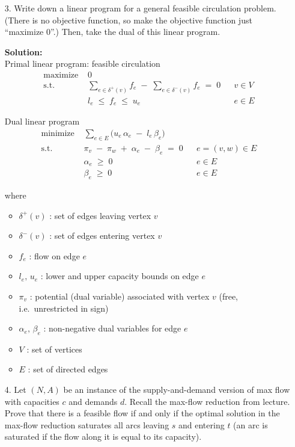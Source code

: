 \documentclass{article}
\begin{document}
\begin{enumerate}
    \newpage

    \item[3.] Write down a linear program for a general feasible circulation problem. (There is no objective function, so make the objective function just ``maximize 0''.)
    Then, take the dual of this linear program.

    \textbf{Solution:} \\

Primal linear program: feasible circulation
\begin{align*}
\text{maximize } & 0 \\[6pt]
\text{s.t. } 
& \sum_{e \in \delta^{+}(v)} f_e \;-\; \sum_{e \in \delta^{-}(v)} f_e \;=\; 0 && v \in V \\[4pt]
& l_e \;\le\; f_e \;\le\; u_e && e \in E
\end{align*}

Dual linear program
\begin{align*}
\text{minimize } & \sum_{e \in E} \bigl(u_e \,\alpha_e \;-\; l_e \,\beta_e\bigr) \\[6pt]
\text{s.t. } 
& \pi_v \;-\; \pi_w \;+\; \alpha_e \;-\; \beta_e \;=\; 0 && e = (v,w) \in E \\[4pt]
& \alpha_e \;\ge\; 0 && e \in E \\[2pt]
& \beta_e \;\ge\; 0 && e \in E
\end{align*}

where
\begin{itemize}
\item $\delta^{+}(v)$ : set of edges leaving vertex $v$
\item $\delta^{-}(v)$ : set of edges entering vertex $v$
\item $f_e$ : flow on edge $e$
\item $l_e,\,u_e$ : lower and upper capacity bounds on edge $e$
\item $\pi_v$ : potential (dual variable) associated with vertex $v$ (free, i.e.\ unrestricted in sign)
\item $\alpha_e,\,\beta_e$ : non-negative dual variables for edge $e$
\item $V$ : set of vertices
\item $E$ : set of directed edges
\end{itemize}

    \newpage

    \item[4.] Let $(N, A)$ be an instance of the supply-and-demand version of max flow with capacities $c$ and demands $d$. Recall the max-flow reduction from lecture. Prove that there is a feasible flow if and only if the optimal solution in the max-flow reduction saturates all arcs leaving $s$ and entering $t$ (an arc is saturated if the flow along it is equal to its capacity).


\end{enumerate}
\end{document}
